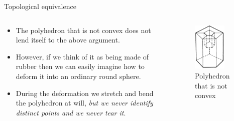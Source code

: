 \documentclass{beamer}
\begin{document}
\begin{frame}{Topological equivalence}
  \begin{columns}
    \begin{column}{0.6\textwidth}
      \begin{block}{}
        \begin{itemize}
        \item The polyhedron that is not convex does not lend itself to the above argument.
        \item However, if we think of it as being made of rubber then we can easily imagine how to deform it into an ordinary round sphere.
        \item During the deformation we stretch and bend the polyhedron at will, \textsl{but we never identify distinct points and we never tear it}.
        \end{itemize}
      \end{block}
    \end{column}
    \begin{column}{0.4\textwidth}
      \begin{figure}
        \centering
        \includegraphics[width=0.7\textwidth]{figure_1_8_c.png}
        \caption{Polyhedron that is not convex}
      \end{figure}
    \end{column}
  \end{columns}
\end{frame}
\end{document}
